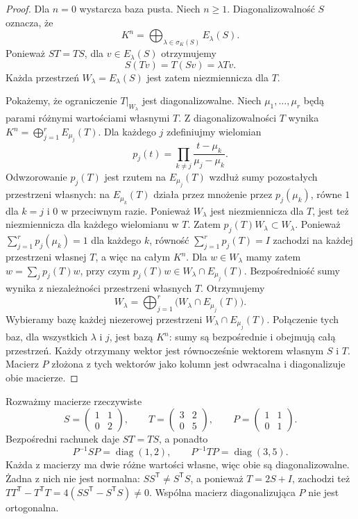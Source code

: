 \begin{proof}
Dla \(n=0\) wystarcza baza pusta.
Niech \(n\geq1\).
Diagonalizowalność \(S\) oznacza, że
\[
 K^n=\bigoplus_{\lambda\in\sigma_K(S)}
                     E_\lambda(S).
\]
Ponieważ \(ST=TS\), dla \(v\in E_\lambda(S)\)
otrzymujemy
\[
 S(Tv)=T(Sv)=\lambda Tv.
\]
Każda przestrzeń \(W_\lambda=E_\lambda(S)\)
jest zatem niezmiennicza dla \(T\).

Pokażemy, że ograniczenie
\(T|_{W_\lambda}\) jest diagonalizowalne.
Niech \(\mu_1,\ldots,\mu_r\)
będą parami różnymi wartościami własnymi \(T\).
Z diagonalizowalności \(T\) wynika
\(K^n=\bigoplus_{j=1}^{r}E_{\mu_j}(T)\).
Dla każdego \(j\) zdefiniujmy wielomian
\[
 p_j(t)=\prod_{k\ne j}
          \frac{t-\mu_k}{\mu_j-\mu_k}.
\]
Odwzorowanie \(p_j(T)\) jest rzutem
na \(E_{\mu_j}(T)\) wzdłuż sumy
pozostałych przestrzeni własnych:
na \(E_{\mu_k}(T)\) działa przez
mnożenie przez \(p_j(\mu_k)\),
równe \(1\) dla \(k=j\) i \(0\) w przeciwnym razie.
Ponieważ \(W_\lambda\) jest niezmiennicza dla \(T\),
jest też niezmiennicza dla każdego wielomianu w \(T\).
Zatem \(p_j(T)W_\lambda\subset W_\lambda\).
Ponieważ \(\sum_{j=1}^r p_j(\mu_k)=1\)
dla każdego \(k\), równość
\(\sum_{j=1}^r p_j(T)=I\) zachodzi
na każdej przestrzeni własnej \(T\),
a więc na całym \(K^n\).
Dla \(w\in W_\lambda\) mamy zatem
\(w=\sum_j p_j(T)w\), przy czym
\(p_j(T)w\in W_\lambda\cap E_{\mu_j}(T)\).
Bezpośredniość sumy wynika z niezależności
przestrzeni własnych \(T\). Otrzymujemy
\[
 W_\lambda
 =\bigoplus_{j=1}^{r}
       \bigl(W_\lambda\cap E_{\mu_j}(T)\bigr).
\]
Wybieramy bazę każdej niezerowej przestrzeni
\(W_\lambda\cap E_{\mu_j}(T)\).
Połączenie tych baz, dla wszystkich
\(\lambda\) i \(j\), jest bazą \(K^n\):
sumy są bezpośrednie i obejmują całą przestrzeń.
Każdy otrzymany wektor jest równocześnie
wektorem własnym \(S\) i \(T\).
Macierz \(P\) złożona z tych wektorów
jako kolumn jest odwracalna i diagonalizuje
obie macierze.
\end{proof}

\begin{przyklad}
\label{prz:lin14-simultaneous-diag-nonnormal}
Rozważmy macierze rzeczywiste
\[
 S=\begin{pmatrix}1&1\\0&2\end{pmatrix},
 \qquad
 T=\begin{pmatrix}3&2\\0&5\end{pmatrix},
 \qquad
 P=\begin{pmatrix}1&1\\0&1\end{pmatrix}.
\]
Bezpośredni rachunek daje
\(ST=TS\), a ponadto
\[
 P^{-1}SP=\operatorname{diag}(1,2),
 \qquad
 P^{-1}TP=\operatorname{diag}(3,5).
\]
Każda z macierzy ma dwie różne wartości
własne, więc obie są diagonalizowalne.
Żadna z nich nie jest normalna:
\(SS^{\mathsf T}\ne S^{\mathsf T}S\),
a ponieważ \(T=2S+I\), zachodzi też
\(TT^{\mathsf T}-T^{\mathsf T}T
=4(SS^{\mathsf T}-S^{\mathsf T}S)\ne0\).
Wspólna macierz diagonalizująca \(P\)
nie jest ortogonalna.
\end{przyklad}


